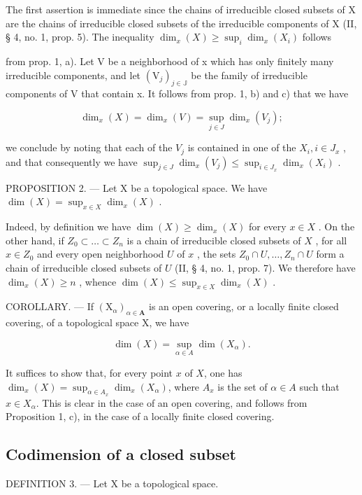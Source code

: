 The first assertion is immediate since the chains of irreducible closed subsets of X are the chains of irreducible closed subsets of the irreducible components of X (II, § 4, no. 1, prop. 5). The inequality \(\dim_x(X) \geqslant \sup_i \dim_x(X_i)\) follows

from prop. 1, a). Let V be a neighborhood of x which has only finitely many irreducible components, and let \((\mathrm{V}_{j})_{j\in\mathbb{J}}\) be the family of irreducible components of V that contain x. It follows from prop. 1, b) and c) that we have

\[
\dim_ {x} (X) = \dim_ {x} (V) = \sup _ {j \in J} \dim_ {x} (V _ {j});
\]

we conclude by noting that each of the \(V_{j}\) is contained in one of the \(X_{i}, i \in J_{x}\) , and that consequently we have \(\sup_{j \in J} \dim_{x}(V_{j}) \leqslant \sup_{i \in J_{x}} \dim_{x}(X_{i})\) .

PROPOSITION 2. — Let X be a topological space. We have \(\dim(X) = \sup_{x \in X} \dim_x(X)\) .

Indeed, by definition we have \(\dim(X) \geqslant \dim_x(X)\) for every \(x \in X\) . On the other hand, if \(Z_0 \subset \ldots \subset Z_n\) is a chain of irreducible closed subsets of \(X\) , for all \(x \in Z_0\) and every open neighborhood \(U\) of \(x\) , the sets \(Z_0 \cap U, \ldots, Z_n \cap U\) form a chain of irreducible closed subsets of \(U\) (II, § 4, no. 1, prop. 7). We therefore have \(\dim_x(X) \geqslant n\) , whence \(\dim(X) \leqslant \sup_{x \in X} \dim_x(X)\) .

COROLLARY. — If \((\mathrm{X}_{\alpha})_{\alpha\in\mathbf{A}}\) is an open covering, or a locally finite closed covering, of a topological space X, we have

\[
\dim (X) = \sup _ {\alpha \in A} \dim (X _ {\alpha}).
\]

It suffices to show that, for every point \(x\) of \(X\), one has \(\dim_x(X) = \sup_{\alpha \in A_x} \dim_x(X_\alpha)\), where \(A_x\) is the set of \(\alpha \in A\) such that \(x \in X_\alpha\). This is clear in the case of an open covering, and follows from Proposition 1, c), in the case of a locally finite closed covering.

\subsection{Codimension of a closed subset}

DEFINITION 3. --- Let X be a topological space.

